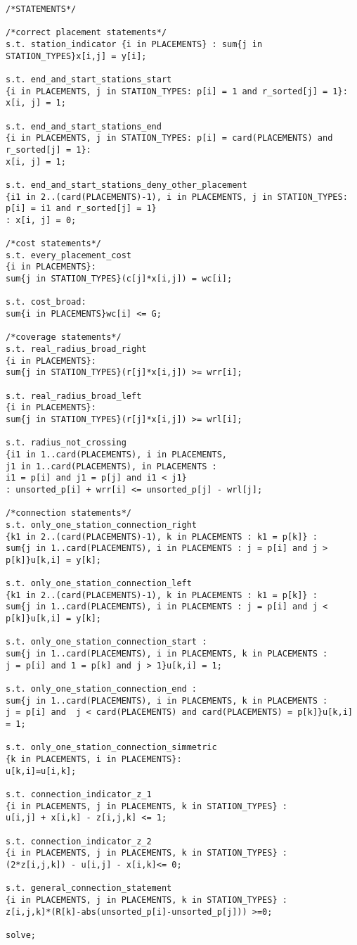 \begin{verbatim}
/*STATEMENTS*/

/*correct placement statements*/ 
s.t. station_indicator {i in PLACEMENTS} : sum{j in STATION_TYPES}x[i,j] = y[i];

s.t. end_and_start_stations_start 
{i in PLACEMENTS, j in STATION_TYPES: p[i] = 1 and r_sorted[j] = 1}: 
x[i, j] = 1; 

s.t. end_and_start_stations_end 
{i in PLACEMENTS, j in STATION_TYPES: p[i] = card(PLACEMENTS) and r_sorted[j] = 1}: 
x[i, j] = 1;

s.t. end_and_start_stations_deny_other_placement 
{i1 in 2..(card(PLACEMENTS)-1), i in PLACEMENTS, j in STATION_TYPES: 
p[i] = i1 and r_sorted[j] = 1}
: x[i, j] = 0; 

/*cost statements*/ 
s.t. every_placement_cost 
{i in PLACEMENTS}: 
sum{j in STATION_TYPES}(c[j]*x[i,j]) = wc[i];

s.t. cost_broad: 
sum{i in PLACEMENTS}wc[i] <= G;

/*coverage statements*/
s.t. real_radius_broad_right 
{i in PLACEMENTS}:
sum{j in STATION_TYPES}(r[j]*x[i,j]) >= wrr[i];

s.t. real_radius_broad_left
{i in PLACEMENTS}:
sum{j in STATION_TYPES}(r[j]*x[i,j]) >= wrl[i];

s.t. radius_not_crossing 
{i1 in 1..card(PLACEMENTS), i in PLACEMENTS, 
j1 in 1..card(PLACEMENTS), in PLACEMENTS : 
i1 = p[i] and j1 = p[j] and i1 < j1} 
: unsorted_p[i] + wrr[i] <= unsorted_p[j] - wrl[j];

/*connection statements*/
s.t. only_one_station_connection_right 
{k1 in 2..(card(PLACEMENTS)-1), k in PLACEMENTS : k1 = p[k]} : 
sum{j in 1..card(PLACEMENTS), i in PLACEMENTS : j = p[i] and j > p[k]}u[k,i] = y[k];

s.t. only_one_station_connection_left 
{k1 in 2..(card(PLACEMENTS)-1), k in PLACEMENTS : k1 = p[k]} : 
sum{j in 1..card(PLACEMENTS), i in PLACEMENTS : j = p[i] and j < p[k]}u[k,i] = y[k];

s.t. only_one_station_connection_start : 
sum{j in 1..card(PLACEMENTS), i in PLACEMENTS, k in PLACEMENTS : 
j = p[i] and 1 = p[k] and j > 1}u[k,i] = 1;

s.t. only_one_station_connection_end :
sum{j in 1..card(PLACEMENTS), i in PLACEMENTS, k in PLACEMENTS : 
j = p[i] and  j < card(PLACEMENTS) and card(PLACEMENTS) = p[k]}u[k,i] = 1;

s.t. only_one_station_connection_simmetric
{k in PLACEMENTS, i in PLACEMENTS}: 
u[k,i]=u[i,k];

s.t. connection_indicator_z_1 
{i in PLACEMENTS, j in PLACEMENTS, k in STATION_TYPES} :
u[i,j] + x[i,k] - z[i,j,k] <= 1;

s.t. connection_indicator_z_2 
{i in PLACEMENTS, j in PLACEMENTS, k in STATION_TYPES} :
(2*z[i,j,k]) - u[i,j] - x[i,k]<= 0;

s.t. general_connection_statement
{i in PLACEMENTS, j in PLACEMENTS, k in STATION_TYPES} : 
z[i,j,k]*(R[k]-abs(unsorted_p[i]-unsorted_p[j])) >=0;

solve;
\end{verbatim}
\clearpage
